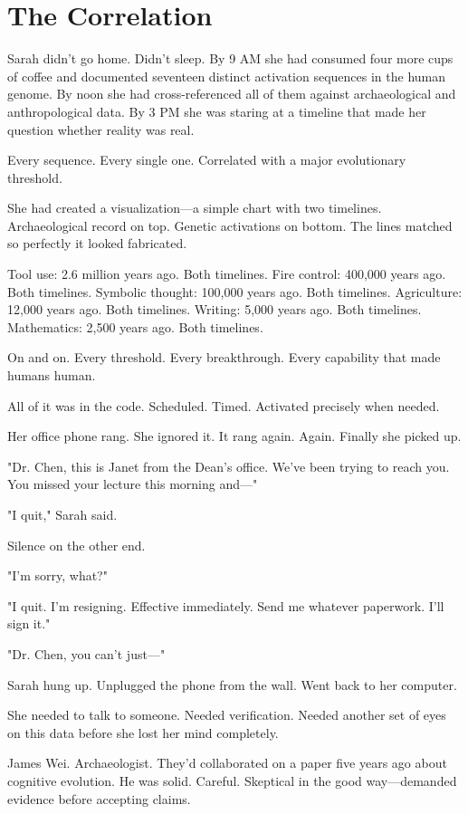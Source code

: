 \chapter{The Correlation}
\label{ch:17}


Sarah didn't go home. Didn't sleep. By 9 AM she had consumed four more cups of coffee and documented seventeen distinct activation sequences in the human genome. By noon she had cross-referenced all of them against archaeological and anthropological data. By 3 PM she was staring at a timeline that made her question whether reality was real.

Every sequence. Every single one. Correlated with a major evolutionary threshold.

She had created a visualization—a simple chart with two timelines. Archaeological record on top. Genetic activations on bottom. The lines matched so perfectly it looked fabricated.

Tool use: 2.6 million years ago. Both timelines.
Fire control: 400,000 years ago. Both timelines.
Symbolic thought: 100,000 years ago. Both timelines.
Agriculture: 12,000 years ago. Both timelines.
Writing: 5,000 years ago. Both timelines.
Mathematics: 2,500 years ago. Both timelines.

On and on. Every threshold. Every breakthrough. Every capability that made humans human.

All of it was in the code. Scheduled. Timed. Activated precisely when needed.

Her office phone rang. She ignored it. It rang again. Again. Finally she picked up.

"Dr. Chen, this is Janet from the Dean's office. We've been trying to reach you. You missed your lecture this morning and—"

"I quit," Sarah said.

Silence on the other end.

"I'm sorry, what?"

"I quit. I'm resigning. Effective immediately. Send me whatever paperwork. I'll sign it."

"Dr. Chen, you can't just—"

Sarah hung up. Unplugged the phone from the wall. Went back to her computer.

She needed to talk to someone. Needed verification. Needed another set of eyes on this data before she lost her mind completely.

James Wei. Archaeologist. They'd collaborated on a paper five years ago about cognitive evolution. He was solid. Careful. Skeptical in the good way—demanded evidence before accepting claims.

